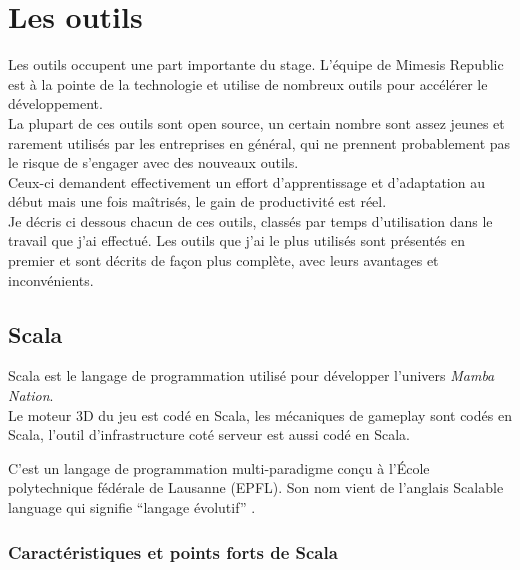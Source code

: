 \chapter{Les outils}       
Les outils occupent une part importante du stage.
L'équipe de Mimesis Republic est à la pointe de la technologie et utilise de
nombreux outils pour accélérer le développement.\\
La plupart de ces outils sont open source, un certain nombre sont assez jeunes
et rarement utilisés par les entreprises en général, qui ne prennent
probablement pas le risque de s'engager avec des nouveaux outils.\\ 
Ceux-ci demandent effectivement un effort d'apprentissage et d'adaptation au
début mais une fois maîtrisés, le gain de productivité est réel.\\


Je décris ci dessous chacun de ces outils,
classés par temps d'utilisation dans le travail que j'ai effectué.
Les outils que j'ai le plus utilisés sont présentés en premier et sont décrits
de façon plus complète, avec leurs avantages et inconvénients.

\section{Scala}
Scala est le langage de programmation utilisé pour développer l'univers \textit{Mamba
  Nation}.\\
Le moteur 3D du jeu est codé en Scala, les mécaniques de gameplay sont codés en
Scala, l'outil d'infrastructure coté serveur est aussi codé en Scala.

C'est un langage de programmation multi-paradigme conçu à l'École polytechnique
fédérale de Lausanne (EPFL).
Son nom vient de l'anglais Scalable language qui signifie  ``langage évolutif''
. 

\subsection{Caractéristiques et points forts de Scala}

